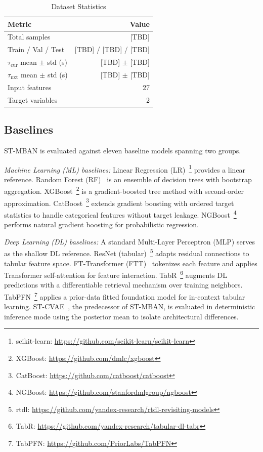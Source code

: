 \documentclass[journal]{IEEEtran}
\begin{document}
\begin{table}[!t]
\centering
\caption{Dataset Statistics}
\label{tab:dataset}
\begin{tabular}{|l|r|}
\hline
\textbf{Metric} & \textbf{Value} \\
\hline
Total samples & [TBD] \\
Train / Val / Test & [TBD] / [TBD] / [TBD] \\
$\tau_\text{cur}$ mean $\pm$ std (s) & [TBD] $\pm$ [TBD] \\
$\tau_\text{nxt}$ mean $\pm$ std (s) & [TBD] $\pm$ [TBD] \\
Input features & 27 \\
Target variables & 2 \\
\hline
\end{tabular}
\end{table}

\subsection{Baselines}
ST-MBAN is evaluated against eleven baseline models spanning two groups.

\textit{Machine Learning (ML) baselines:}
Linear Regression (LR)~\cite{sklearn2011}\footnote{scikit-learn: \url{https://github.com/scikit-learn/scikit-learn}} provides a linear reference.
Random Forest (RF)~\cite{RF2001, sklearn2011} is an ensemble of decision trees with bootstrap aggregation.
XGBoost~\cite{XGBoost2016}\footnote{XGBoost: \url{https://github.com/dmlc/xgboost}} is a gradient-boosted tree method with second-order approximation.
CatBoost~\cite{CatBoost2018}\footnote{CatBoost: \url{https://github.com/catboost/catboost}} extends gradient boosting with ordered target statistics to handle categorical features without target leakage.
NGBoost~\cite{NGBoost2020}\footnote{NGBoost: \url{https://github.com/stanfordmlgroup/ngboost}} performs natural gradient boosting for probabilistic regression.

\textit{Deep Learning (DL) baselines:}
A standard Multi-Layer Perceptron (MLP) serves as the shallow DL reference.
ResNet (tabular)~\cite{Gorishniy2021}\footnote{rtdl: \url{https://github.com/yandex-research/rtdl-revisiting-models}} adapts residual connections to tabular feature space.
FT-Transformer (FTT)~\cite{Gorishniy2021} tokenizes each feature and applies Transformer self-attention for feature interaction.
TabR~\cite{TabR2023}\footnote{TabR: \url{https://github.com/yandex-research/tabular-dl-tabr}} augments DL predictions with a differentiable retrieval mechanism over training neighbors.
TabPFN~\cite{TabPFN2025}\footnote{TabPFN: \url{https://github.com/PriorLabs/TabPFN}} applies a prior-data fitted foundation model for in-context tabular learning.
ST-CVAE~\cite{STCVAE}, the predecessor of ST-MBAN, is evaluated in deterministic inference mode using the posterior mean to isolate architectural differences.
\end{document}
